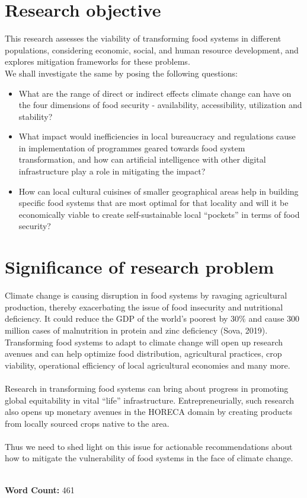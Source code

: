 \documentclass[12pt, twoside]{report}
\begin{document}
\begin{multicols}{2}
\section*{Research objective}%
This research assesses the viability of transforming food systems in different populations, considering economic, social, and human resource development, and explores mitigation frameworks for these problems. \\ 
We shall investigate the same by posing the following questions:
\begin{itemize}
	\item What are the range of direct or indirect effects climate change can have on the four dimensions of food security - availability, accessibility, utilization and stability?
	\item What impact would inefficiencies in local bureaucracy and regulations cause in implementation of programmes geared towards food system transformation, and how can artificial intelligence with other digital infrastructure play a role in mitigating the impact?
	\item How can local cultural cuisines of smaller geographical areas help in building specific food systems that are most optimal for that locality and will it be economically viable to create self-sustainable local “pockets” in terms of food security?
\end{itemize}

\section*{Significance of research problem}%
Climate change is causing disruption in food systems by ravaging agricultural production, thereby exacerbating the issue of food insecurity and nutritional deficiency. It could reduce the GDP of the world’s poorest by $ 30 \% $ and cause $ 300 $ million cases of malnutrition in protein and zinc deficiency (Sova, 2019). \\
Transforming food systems to adapt to climate change will open up research avenues and can help optimize food distribution, agricultural practices, crop viability, operational efficiency of local agricultural economies and many more. \\ \\
Research in transforming food systems can bring about progress in promoting global equitability in vital ``life'' infrastructure. Entrepreneurially, such research also opens up monetary avenues in the HORECA domain by creating products from locally sourced crops native to the area. \\ \\
Thus we need to shed light on this issue for actionable recommendations about how to mitigate the vulnerability of food systems in the face of climate change.

\end{multicols}

\\
\flushright
\textbf{Word Count:} 461



\nocite{gregory2005}
\nocite{sova2019}
\nocite{wheeler2013}
\end{document}

